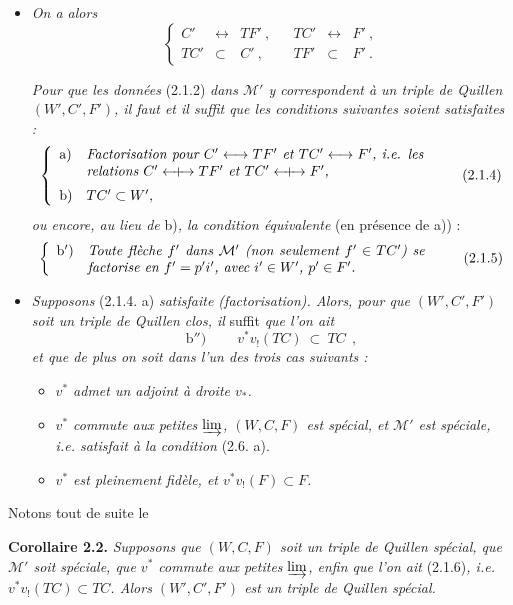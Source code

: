 \documentclass[11pt]{article}
\newcommand{\msp}[1]{\marginpar{\footnotesize [#1]}}
\newcommand{\M}{\mathcal{M}}
\newcommand{\Qcouple}{\mathrel{\leftarrow\mkern-9mu{+}\mkern-9mu\rightarrow}}
\begin{document}
\begin{itemize}
\item[1°)] \textit{On a alors}
\[
\left\{
\begin{array}{rclcrcl}
C' & \longleftrightarrow & TF'\ , & & TC' & \longleftrightarrow & F'\ ,\\
TC' & \subset & C'\ , & & TF' & \subset & F'\ .
\end{array}\right.
\tag*{(2.1.3)}
\]

\textit{Pour que les données} (2.1.2) \textit{dans $\M'$ y correspondent à un triple de Quillen $(W',C',F')$, il faut et il suffit que les conditions suivantes soient satisfaites :}
\msp{page 16}
\[
\left\{
\begin{array}{ll}
\text{a)} & \parbox[t]{0.7\textwidth}{\textit{Factorisation pour $C' \longleftrightarrow TF'$ et $TC' \longleftrightarrow F'$, i.e. les relations $C' \Qcouple TF'$ et $TC' \Qcouple F'$,}}\\[4ex]
\text{b)} & TC' \subset W',
\end{array}\right. %
\tag*{(2.1.4)}
\]
\textit{ou encore, au lieu de} b)\textit{, la condition équivalente} (en présence de a)) :
\[
\left\{
\begin{array}{ll}
\text{b$'$)} & \parbox[t]{0.7\textwidth}{\textit{Toute flèche $f'$ dans $\M'$ (non seulement $f' \in TC'$) se factorise en $f' = p'i'$, avec $i' \in W'$, $p' \in F'$.}}
\end{array}\right.
\tag*{(2.1.5)}
\]
\item[2°)] \textit{Supposons} (2.1.4. a) \textit{satisfaite (factorisation). Alors, pour que $(W',C',F')$ soit un triple de Quillen clos, il} suffit \textit{que l'on ait}
\[
\text{b$''$)}\qquad \boxed{\ v^*v_!(TC)\ \subset\ TC\ }\ ,
\tag*{(2.1.6)}
\]
\textit{et que de plus on soit dans l'un des trois cas suivants :}
\begin{itemize}
\item[A)] \textit{$v^*$ admet un adjoint à droite $v_*$.}
\item[B)] \textit{$v^*$ commute aux petites} $\varinjlim$\textit{, $(W,C,F)$ est spécial, et $\M'$ est spéciale, i.e. satisfait à la condition} (2.6. a).
\item[C)] \textit{$v^*$ est pleinement fidèle, et $v^*v_!(F) \subset F$.}
\end{itemize}
\end{itemize}
Notons tout de suite le

\textbf{Corollaire 2.2.} \textit{Supposons que $(W,C,F)$ soit un triple de Quillen spécial, que $\M'$ soit spéciale, que $v^*$ commute aux petites} $\varinjlim$\textit{, enfin que l'on ait} (2.1.6)\textit{, i.e. $v^*v_!(TC) \subset TC$. Alors $(W',C',F')$ est un triple de Quillen spécial.}
\end{document}
